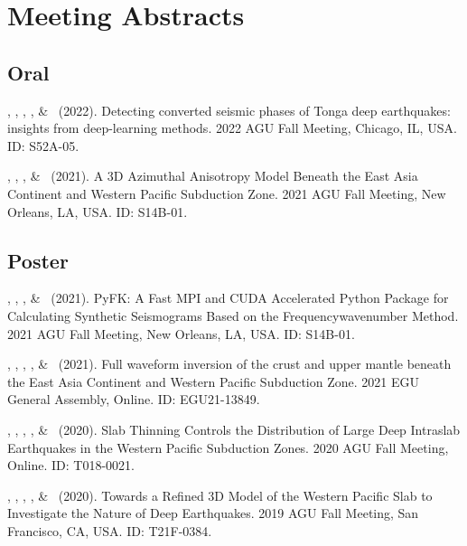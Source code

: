 \section{Meeting Abstracts}

\subsection{Oral}

\begin{etaremune}
\item
    \Me, \SWei, \NSaloor, \WZhu, \& \GBeroza\ (2022).
    Detecting converted seismic phases of Tonga deep earthquakes: insights from deep-learning methods.
    2022 AGU Fall Meeting, Chicago, IL, USA. ID: S52A-05.
\item
    \Me, \MChen, \JLi, \& \SWei\ (2021).
    A 3D Azimuthal Anisotropy Model Beneath the East Asia Continent and Western Pacific Subduction Zone.
    2021 AGU Fall Meeting, New Orleans, LA, USA. ID: S14B-01.
\end{etaremune}

\subsection{Poster}

\begin{etaremune}
\item
    \Me, \JLi, \MChen, \& \SWei\ (2021).
    PyFK: A Fast MPI and CUDA Accelerated Python Package for Calculating Synthetic Seismograms Based on the Frequencywavenumber Method.
    2021 AGU Fall Meeting, New Orleans, LA, USA. ID: S14B-01.
\item
    \Me, \MChen, \TZhou, \BWang, \& \YKim\ (2021).
    Full waveform inversion of the crust and upper mantle beneath the East Asia Continent and Western Pacific Subduction Zone.
    2021 EGU General Assembly, Online. ID: EGU21-13849.
\item
    \Me, \MChen, \TZhou, \BWang, \& \YKim\ (2020).
    Slab Thinning Controls the Distribution of Large Deep Intraslab Earthquakes in the Western Pacific Subduction Zones.
    2020 AGU Fall Meeting, Online. ID: T018-0021.
\item
    \Me, \MChen, \TZhou, \BWang, \& \YKim\ (2020).
    Towards a Refined 3D Model of the Western Pacific Slab to Investigate the Nature of Deep Earthquakes.
    2019 AGU Fall Meeting, San Francisco, CA, USA. ID: T21F-0384.
\end{etaremune}
